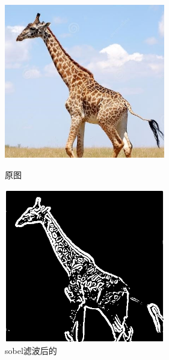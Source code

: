 \documentclass[11pt, a4paper, UTF8]{ctexart}
\begin{document}
\begin{figure}[H]
  \centering
  \begin{minipage}[t]{0.48\textwidth}
  \centering
  \includegraphics[width=7cm]{giraffe.jpg}
  \caption{原图}
  \end{minipage}
  \begin{minipage}[t]{0.48\textwidth}
  \centering
  \includegraphics[width=7cm]{sobel_all_giraffe.png}
  \caption{sobel滤波后的}
  \end{minipage}
\end{figure}
\end{document}
